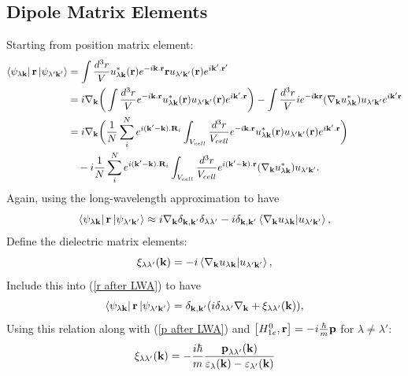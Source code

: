 \documentclass[12pt,english,a4paper]{article}
\begin{document}
\begin{appendices}
\section{Dipole Matrix Elements}
\label{Dipole Matrix Elements}
\quad Starting from position matrix element:
\begin{align}
\bra{\psi_{\lambda \textbf{k}}}\textbf{r}\ket{\psi_{\lambda'\textbf{k}'}} &= \int \frac{d^3 r}{V} u^*_{\lambda \textbf{k}}(\textbf{r}) e^{-i\textbf{k}.\textbf{r}} \textbf{r} u_{\lambda' \textbf{k}'}(\textbf{r}) e^{i\textbf{k}'.\textbf{r}'}\\
&= i \nabla_\textbf{k} \bigg(\int \frac{d^3 r}{V} e^{-i\textbf{k}.\textbf{r}}u^*_{\lambda \textbf{k}}(\textbf{r}) u_{\lambda' \textbf{k}'}(\textbf{r})e^{i\textbf{k}'.\textbf{r}}\bigg) - \int \frac{d^3 r}{V} i e^{-i\textbf{k}\textbf{r}}(\nabla_\textbf{k} u^*_{\lambda \textbf{k}}) u_{\lambda' \textbf{k}'} e^{i\textbf{k}'\textbf{r}}\nonumber\\
&= i \nabla_\textbf{k} \bigg(\frac{1}{N} \sum_{i}^N e^{i(\textbf{k}'-\textbf{k}).\textbf{R}_i}\int_{V_{cell}} \frac{d^3 r}{V_{cell}} e^{-i\textbf{k}.\textbf{r}}u^*_{\lambda \textbf{k}}(\textbf{r}) u_{\lambda' \textbf{k}'}(\textbf{r})e^{i\textbf{k}'.\textbf{r}}\bigg)\nonumber\\
&\quad  - i\frac{1}{N}\sum_{i}^N e^{i(\textbf{k}'-\textbf{k}).\textbf{R}_i} \int_{V_{cell}} \frac{d^3 r}{V_{cell}} e^{i(\textbf{k}'-\textbf{k}).\textbf{r}} (\nabla_\textbf{k} u^*_{\lambda \textbf{k}}) u_{\lambda' \textbf{k}'}.
\end{align}
\quad Again, using the long-wavelength approximation to have
\begin{equation}
	\label{r after LWA}
	\bra{\psi_{\lambda \textbf{k}}}\textbf{r}\ket{\psi_{\lambda'\textbf{k}'}} \approx i \nabla_{\textbf{k}} \delta_{\textbf{k},\textbf{k}'}\delta_{\lambda \lambda'} - i \delta_{\textbf{k},\textbf{k}'} \braket{\nabla_\textbf{k}u_{\lambda \textbf{k}}}{u_{\lambda'\textbf{k}'}},
\end{equation}
\quad Define the dielectric matrix elements:
\begin{equation}
	\xi_{\lambda\lambda'}(\textbf{k}) = - i \braket{\nabla_\textbf{k}u_{\lambda \textbf{k}}}{u_{\lambda'\textbf{k}'}},
\end{equation}
\quad Include this into (\ref{r after LWA}) to have
\begin{equation}
	\bra{\psi_{\lambda \textbf{k}}}\textbf{r}\ket{\psi_{\lambda'\textbf{k}'}} = \delta_{\textbf{k},\textbf{k}'}(i\delta_{\lambda \lambda'} \nabla_{\textbf{k}}  +  \xi_{\lambda\lambda'}(\textbf{k})),
\end{equation}
Using this relation along with (\ref{p after LWA}) and $\comm{H^0_{1e}}{\textbf{r}} = -i\frac{\hbar}{m}\textbf{p}$ for $\lambda \neq \lambda'$:
\begin{equation}
	\xi_{\lambda\lambda'}(\textbf{k}) = -\frac{i\hbar}{m}\frac{\textbf{p}_{\lambda\lambda'}(\textbf{k})}{\varepsilon_{\lambda}(\textbf{\textbf{k}}) - \varepsilon_{\lambda'}(\textbf{k})}
\end{equation}
\end{appendices}
\end{document}
